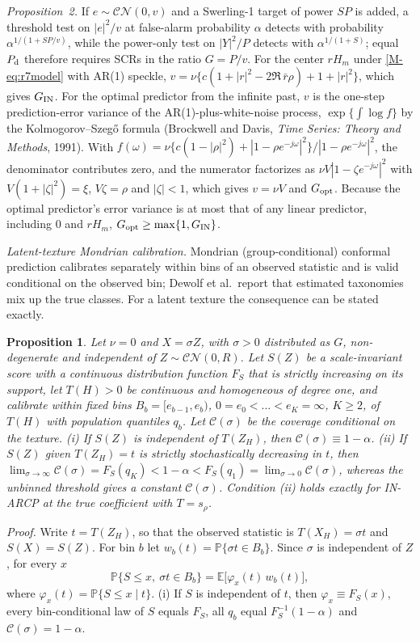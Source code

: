 \documentclass[10pt]{article}
\newtheorem{propS}{Proposition}
\begin{document}
\emph{Proposition~2.} If $e\sim\mathcal{CN}(0,v)$ and a Swerling-1 target of power $SP$ is added, a threshold test on $|e|^2/v$ at false-alarm probability $\alpha$ detects with probability $\alpha^{1/(1+SP/v)}$, while the power-only test on $|Y|^2/P$ detects with $\alpha^{1/(1+S)}$; equal $P_{\rm d}$ therefore requires SCRs in the ratio $G=P/v$. For the center $rH_m$ under \eqref{M-eq:r7model} with AR(1) speckle, $v=\nu\{c(1+|r|^2-2\Re\,\bar r\rho)+1+|r|^2\}$, which gives $G_{\rm IN}$. For the optimal predictor from the infinite past, $v$ is the one-step prediction-error variance of the AR(1)-plus-white-noise process, $\exp\{\int\log f\}$ by the Kolmogorov--Szeg\H{o} formula (Brockwell and Davis, \emph{Time Series: Theory and Methods}, 1991). With $f(\omega)=\nu\{c(1-|\rho|^2)+|1-\rho e^{-j\omega}|^2\}/|1-\rho e^{-j\omega}|^2$, the denominator contributes zero, and the numerator factorizes as $\nu V|1-\zeta e^{-j\omega}|^2$ with $V(1+|\zeta|^2)=\xi$, $V\zeta=\rho$ and $|\zeta|<1$, which gives $v=\nu V$ and $G_{\rm opt}$. Because the optimal predictor's error variance is at most that of any linear predictor, including $0$ and $rH_m$, $G_{\rm opt}\ge\max\{1,G_{\rm IN}\}$.

\emph{Latent-texture Mondrian calibration.} Mondrian (group-conditional) conformal prediction calibrates separately within bins of an observed statistic and is valid conditional on the observed bin; Dewolf et al.\ report that estimated taxonomies mix up the true classes. For a latent texture the consequence can be stated exactly.
\begin{propS}\label{prop:mondrian}
Let $\nu=0$ and $X=\sigma Z$, with $\sigma>0$ distributed as $G$, non-degenerate and independent of $Z\sim\mathcal{CN}(0,R)$. Let $S(Z)$ be a scale-invariant score with a continuous distribution function $F_S$ that is strictly increasing on its support, let $T(H)>0$ be continuous and homogeneous of degree one, and calibrate within fixed bins $B_b=[e_{b-1},e_b)$, $0=e_0<\dots<e_K=\infty$, $K\ge2$, of $T(H)$ with population quantiles $q_b$. Let $\mathcal C(\sigma)$ be the coverage conditional on the texture.
(i) If $S(Z)$ is independent of $T(Z_H)$, then $\mathcal C(\sigma)\equiv1-\alpha$.
(ii) If $S(Z)$ given $T(Z_H)=t$ is strictly stochastically decreasing in $t$, then $\lim_{\sigma\to\infty}\mathcal C(\sigma)=F_S(q_K)<1-\alpha<F_S(q_1)=\lim_{\sigma\to0}\mathcal C(\sigma)$, whereas the unbinned threshold gives a constant $\mathcal C(\sigma)$. Condition (ii) holds exactly for IN-ARCP at the true coefficient with $T=s_\rho$.
\end{propS}
\emph{Proof.}
Write $t=T(Z_H)$, so that the observed statistic is $T(X_H)=\sigma t$ and $S(X)=S(Z)$. For bin $b$ let $w_b(t)=\mathbb{P}\{\sigma t\in B_b\}$. Since $\sigma$ is independent of $Z$, for every $x$
\begin{equation}
\mathbb{P}\{S\le x,\ \sigma t\in B_b\}=\mathbb E\big[\varphi_x(t)\,w_b(t)\big],
\tag{S1}
\end{equation}
where $\varphi_x(t)=\mathbb{P}\{S\le x\mid t\}$.
(i) If $S$ is independent of $t$, then $\varphi_x\equiv F_S(x)$, every bin-conditional law of $S$ equals $F_S$, all $q_b$ equal $F_S^{-1}(1-\alpha)$ and $\mathcal C(\sigma)=1-\alpha$.
\end{document}

